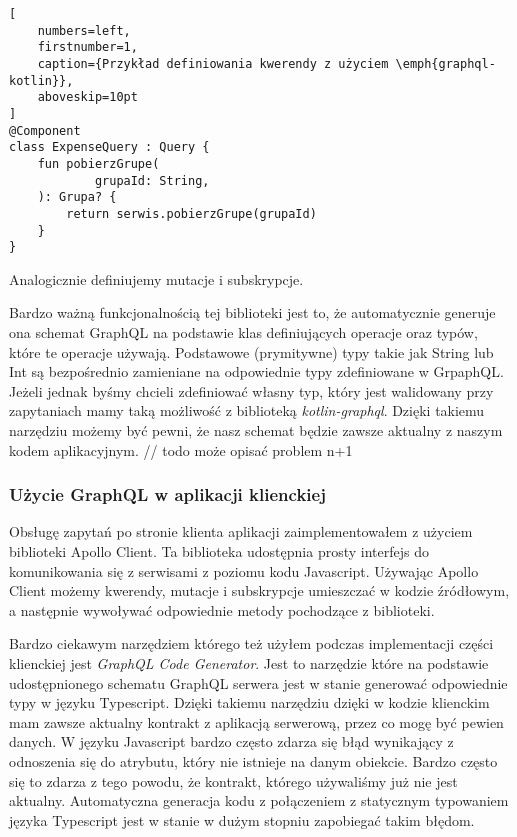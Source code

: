\begin{addmargin}[6mm]{0mm}
\begin{lstlisting}[
    numbers=left,
    firstnumber=1,
    caption={Przykład definiowania kwerendy z użyciem \emph{graphql-kotlin}},
    aboveskip=10pt
]
@Component
class ExpenseQuery : Query {
    fun pobierzGrupe(
            grupaId: String,
    ): Grupa? {
        return serwis.pobierzGrupe(grupaId)
    }
}
\end{lstlisting}
\end{addmargin}
  
Analogicznie definiujemy mutacje i subskrypcje.

Bardzo ważną funkcjonalnością tej biblioteki jest to, że automatycznie generuje ona schemat GraphQL na podstawie klas definiujących operacje oraz typów, które te operacje używają. Podstawowe (prymitywne) typy takie jak String lub Int są bezpośrednio zamieniane na odpowiednie typy zdefiniowane w GrpaphQL. Jeżeli jednak byśmy chcieli zdefiniować własny typ, który jest walidowany przy zapytaniach mamy taką możliwość z biblioteką \emph{kotlin-graphql}. 
Dzięki takiemu narzędziu możemy być pewni, że nasz schemat będzie zawsze aktualny z naszym kodem aplikacyjnym.
// todo może opisać problem n+1

\subsubsection{Użycie GraphQL w aplikacji klienckiej}
Obsługę zapytań po stronie klienta aplikacji zaimplementowałem z użyciem biblioteki Apollo Client. Ta biblioteka udostępnia prosty interfejs do komunikowania się z serwisami z poziomu kodu Javascript. Używając Apollo Client możemy kwerendy, mutacje i subskrypcje umieszczać w kodzie źródłowym, a następnie wywoływać odpowiednie metody pochodzące z biblioteki. 

Bardzo ciekawym narzędziem którego też użyłem podczas implementacji części klienckiej jest \emph{GraphQL Code Generator}. Jest to narzędzie które na podstawie udostępnionego schematu GraphQL serwera jest w stanie generować odpowiednie typy w języku Typescript. Dzięki takiemu narzędziu dzięki w kodzie klienckim mam zawsze aktualny kontrakt z aplikacją serwerową, przez co mogę być pewien danych. W języku Javascript bardzo często zdarza się błąd wynikający z odnoszenia się do atrybutu, który nie istnieje na danym obiekcie. Bardzo często się to zdarza z tego powodu, że kontrakt, którego używaliśmy już nie jest aktualny. Automatyczna generacja kodu z połączeniem z statycznym typowaniem języka Typescript jest w stanie w dużym stopniu zapobiegać takim błędom.

